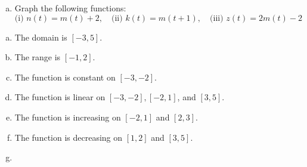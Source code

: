 \documentclass[11pt]{exam}
\begin{document}
\begin{questions}
\begin{enumerate}[(a)]
\item Graph the following functions:
\[
\text{(i) } n(t) = m(t)+2, \quad \text{(ii) } k(t)= m(t+1), \quad \text{(iii) } z(t) = 2m(t) - 2
\]
\end{enumerate}
\begin{solution}
  \begin{enumerate}[(a)]
  \item The domain is \([-3,5]\).
  \item The range is \([-1,2]\).
  \item The function is constant on \([-3,-2]\).
  \item The function is linear on \([-3,-2], [-2,1]\), and \([3,5]\).
  \item The function is increasing on \([-2,1]\) and \([2,3]\).
  \item The function is decreasing on \([1,2]\) and \([3,5]\).
  \item 
    \vspace{5in}
  \end{enumerate}
\end{solution}
    \end{questions}
  
\end{document}
